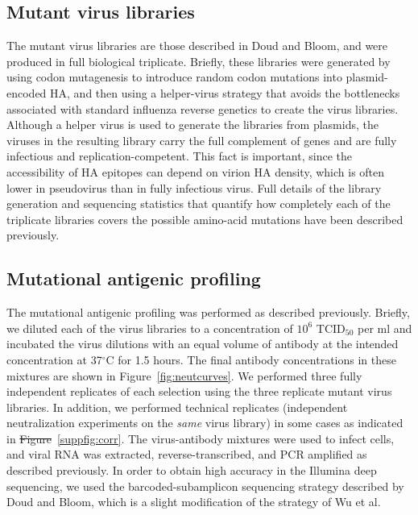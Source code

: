 \documentclass[11pt]{article}
\providecommand{\DIFaddtex}[1]{{\protect\color{blue}\uwave{#1}}} %
\providecommand{\DIFdeltex}[1]{{\protect\color{red}\sout{#1}}}                      %
\providecommand{\DIFaddbegin}{} %
\providecommand{\DIFaddend}{} %
\providecommand{\DIFdelbegin}{} %
\providecommand{\DIFdelend}{} %
\providecommand{\DIFadd}[1]{\texorpdfstring{\DIFaddtex{#1}}{#1}} %
\providecommand{\DIFdel}[1]{\texorpdfstring{\DIFdeltex{#1}}{}} %
\begin{document}
\subsection*{Mutant virus libraries}
The mutant virus libraries are those described in Doud and Bloom\cite{doud2016accurate}, and were produced in full biological triplicate.
Briefly, these libraries were generated by using codon mutagenesis\cite{bloom2014experimentally} to introduce random codon mutations into plasmid-encoded HA, and then using a helper-virus strategy that avoids the bottlenecks associated with standard influenza reverse genetics to create the virus libraries.
Although a helper virus is used to generate the libraries from plasmids, the viruses in the resulting library carry the full complement of genes and are fully infectious and replication-competent\cite{doud2016accurate}.
This fact is important, since the accessibility of HA epitopes can depend on virion HA density, which is often lower in pseudovirus than in fully infectious virus\cite{corti2011neutralizing,joyce2016vaccine}.
Full details of the library generation and sequencing statistics that quantify how completely each of the triplicate libraries covers the possible amino-acid mutations have been described previously\cite{doud2016accurate}.

\subsection*{Mutational antigenic profiling}
The mutational antigenic profiling was performed as described previously\cite{doud2017complete}. 
Briefly, we diluted each of the virus libraries to a concentration of $10^{6}$ TCID$_{50}$ per ml and incubated the virus dilutions with an equal volume of antibody at the intended concentration at 37$^\circ$C for 1.5 hours.
The final antibody concentrations in these mixtures are shown in Figure~\ref{fig:neutcurves}.
We performed three fully independent replicates of each selection using the three replicate mutant virus libraries.
In addition, we performed technical replicates (independent neutralization experiments on the \emph{same} virus library) in some cases as indicated in \DIFdelbegin \DIFdel{Figure}\DIFdelend \DIFaddbegin \DIFadd{Supplementary Fig.}\DIFaddend ~\ref{suppfig:corr}.
The virus-antibody mixtures were used to infect cells, and viral RNA was extracted, reverse-transcribed, and PCR amplified as described previously\cite{doud2017complete}.
In order to obtain high accuracy in the Illumina deep sequencing, we used the barcoded-subamplicon sequencing strategy described by Doud and Bloom\cite{doud2016accurate}, which is a slight modification of the strategy of Wu et al\cite{wu2014high}.
\end{document}
